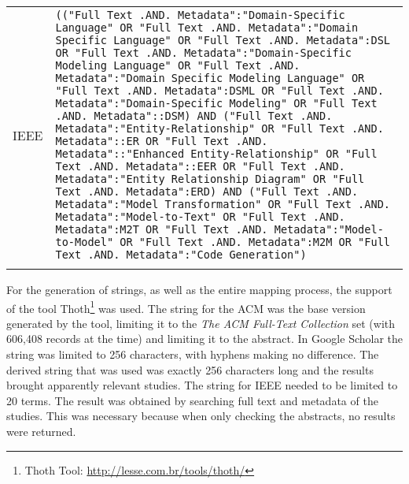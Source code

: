 \begin{table}[!htb]
\begin{tabular}{m{1.0cm}m{14.0cm}}
\T IEEE & \texttt{(("Full Text .AND. Metadata":"Domain-Specific Language" OR "Full Text .AND. Metadata":"Domain Specific Language" OR "Full Text .AND. Metadata":DSL OR "Full Text .AND. Metadata":"Domain-Specific Modeling Language" OR "Full Text .AND. Metadata":"Domain Specific Modeling Language" OR "Full Text .AND. Metadata":DSML OR "Full Text .AND. Metadata":"Domain-Specific Modeling" OR "Full Text .AND. Metadata"::DSM) AND ("Full Text .AND. Metadata":"Entity-Relationship" OR "Full Text .AND. Metadata"::ER OR "Full Text .AND. Metadata"::"Enhanced Entity-Relationship" OR "Full Text .AND. Metadata"::EER OR "Full Text .AND. Metadata":"Entity Relationship Diagram" OR "Full Text .AND. Metadata":ERD) AND ("Full Text .AND. Metadata":"Model Transformation" OR "Full Text .AND. Metadata":"Model-to-Text" OR "Full Text .AND. Metadata":M2T OR "Full Text .AND. Metadata":"Model-to-Model" OR "Full Text .AND. Metadata":M2M OR "Full Text .AND. Metadata":"Code Generation")} \\
\noalign{\smallskip} 
\toprule
\end{tabular}
\end{table}    

For the generation of strings, as well as the entire mapping process, the support of the tool Thoth\footnote{Thoth Tool: \url{http://lesse.com.br/tools/thoth/}} was used.
The string for the ACM was the base version generated by the tool, limiting it to the \textit{The ACM Full-Text Collection} set (with 606,408 records at the time) and limiting it to the abstract.
In Google Scholar the string was limited to 256 characters, with hyphens making no difference.
The derived string that was used was exactly 256 characters long and the results brought apparently relevant studies.
The string for IEEE needed to be limited to 20 terms.
The result was obtained by searching full text and metadata of the studies.
This was necessary because when only checking the abstracts, no results were returned.


